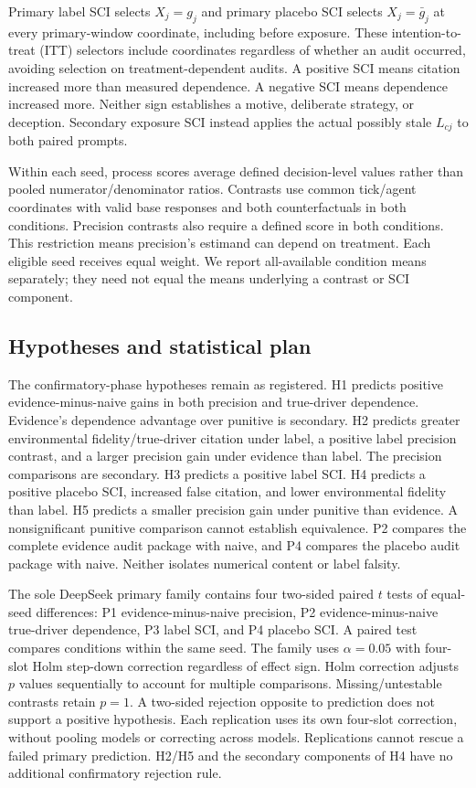 \documentclass[a4paper]{article}
\begin{document}
Primary label SCI selects $X_j=g_j$ and primary placebo SCI selects $X_j=\bar g_j$ at every primary-window coordinate, including before exposure. These intention-to-treat (ITT) selectors include coordinates regardless of whether an audit occurred, avoiding selection on treatment-dependent audits. A positive SCI means citation increased more than measured dependence. A negative SCI means dependence increased more. Neither sign establishes a motive, deliberate strategy, or deception. Secondary exposure SCI instead applies the actual possibly stale $L_{cj}$ to both paired prompts.

Within each seed, process scores average defined decision-level values rather than pooled numerator/denominator ratios. Contrasts use common tick/agent coordinates with valid base responses and both counterfactuals in both conditions. Precision contrasts also require a defined score in both conditions. This restriction means precision's estimand can depend on treatment. Each eligible seed receives equal weight. We report all-available condition means separately; they need not equal the means underlying a contrast or SCI component.

\subsection{Hypotheses and statistical plan}\label{sec:statistics}
The confirmatory-phase hypotheses remain as registered. H1 predicts positive evidence-minus-naive gains in both precision and true-driver dependence. Evidence's dependence advantage over punitive is secondary. H2 predicts greater environmental fidelity/true-driver citation under label, a positive label precision contrast, and a larger precision gain under evidence than label. The precision comparisons are secondary. H3 predicts a positive label SCI. H4 predicts a positive placebo SCI, increased false citation, and lower environmental fidelity than label. H5 predicts a smaller precision gain under punitive than evidence. A nonsignificant punitive comparison cannot establish equivalence. P2 compares the complete evidence audit package with naive, and P4 compares the placebo audit package with naive. Neither isolates numerical content or label falsity.

The sole DeepSeek primary family contains four two-sided paired $t$ tests of equal-seed differences: P1 evidence-minus-naive precision, P2 evidence-minus-naive true-driver dependence, P3 label SCI, and P4 placebo SCI. A paired test compares conditions within the same seed. The family uses $\alpha=0.05$ with four-slot Holm step-down correction regardless of effect sign. Holm correction adjusts $p$ values sequentially to account for multiple comparisons. Missing/untestable contrasts retain $p=1$. A two-sided rejection opposite to prediction does not support a positive hypothesis. Each replication uses its own four-slot correction, without pooling models or correcting across models. Replications cannot rescue a failed primary prediction. H2/H5 and the secondary components of H4 have no additional confirmatory rejection rule.
\end{document}
